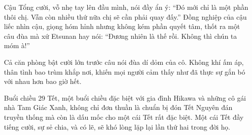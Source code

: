 \documentclass[../main.tex]{subfiles}
\begin{document}
Cậu Tổng cười, vỗ nhẹ tay lên đầu mình, nói đầy ẩn ý: ``Đó mới chỉ là một phần thôi chị. Vẫn còn nhiều thứ nữa chị sẽ cần phải quay đấy.'' Đồng nghiệp của cậu liếc nhìn cậu, giọng hóm hỉnh nhưng không kém phần quyết tâm, thốt ra một câu đùa mà xứ Etsunan hay nói: ``Đương nhiên là thế rồi. Không thì chún ta móm à!''

Cả căn phòng bật cười lớn trước câu nói đùa dí dỏm của cô. Không khí ấm áp, thân tình bao trùm khắp nơi, khiến mọi người cảm thấy như đã thực sự gắn bó với nhau hơn bao giờ hết.

Buổi chiều 29 Tết, một buổi chiều đặc biệt với gia đình Hikawa và những cô gái nhà Tam Giác Xanh, không chỉ đơn thuần là chuẩn bị đón Tết Nguyên đán truyền thống mà còn là dấu mốc cho một cái Tết rất đặc biệt. Một cái Tết đầy tiếng cười, sự sẻ chia, và có lẽ, sẽ khó lòng lặp lại lần thứ hai trong đời họ.
\end{document}
